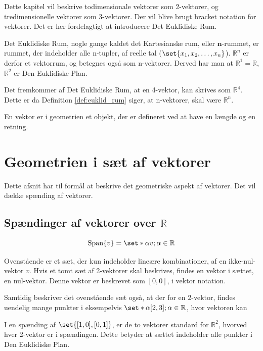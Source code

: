 Dette kapitel vil beskrive todimensionale vektorer som 2-vektorer, og tredimensionelle vektorer som 3-vektorer.
Der vil blive brugt bracket notation for vektorer.
Det er her fordelagtigt at introducere Det Euklidiske Rum.
\begin{frdef}\label{def:euklid_rum}
	Det Euklidiske Rum, nogle gange kaldet det Kartesianske rum, eller $\mathbf{n}$-rummet, er rummet, der indeholder alle n-tupler, af reelle tal ($\set{x_1,x_2,\dots,x_n}$).
$\mathbb{R}^n$ er derfor et vektorrum, og betegnes også som n-vektorer.
Derved har man at $\mathbb{R}^1=\mathbb{R}$, $\mathbb{R}^2$ er Den Euklidiske Plan.
\end{frdef}

Det fremkommer af Det Euklidiske Rum, at en 4-vektor, kan skrives som $\mathbb{R}^4$.
Dette er da Definition \ref{def:euklid_rum} siger, at n-vektorer, skal være $\mathbb{R}^n$.

\begin{frdef}[Vektorer]
	En vektor er i geometrien et objekt, der er defineret ved at have en længde og en retning.
\end{frdef}


\section{Geometrien i sæt af vektorer}
Dette afsnit har til formål at beskrive det geometriske aspekt af vektorer.
Det vil dække spænding af vektorer.

\subsection{Spændinger af vektorer over $\mathbb{R}$}
 
\begin{equation}
	\mathrm{Span}\{v\}=\set*{\alpha v; \alpha\in\mathbb{R}}
\end{equation}

Ovenstående er et sæt, der kun indeholder lineære kombinationer, af en ikke-nul-vektor $v$.
Hvis et tomt sæt af 2-vektorer skal beskrives, findes en vektor i sættet, en nul-vektor.
Denne vektor er beskrevet som $[0,0]$, i vektor notation.

Samtidig beskriver det ovenstående sæt også, at der for en 2-vektor, findes uendelig mange punkter i eksempelvis $\set*{\alpha[2,3]; \alpha\in\mathbb{R}}$, hvor vektoren kan 

I en spænding af $\set{[1,0],[0,1]}$, er de to vektorer standard for $\mathbb{R}^2$, hvorved hver 2-vektor er i spændingen.
Dette betyder at sættet indeholder alle punkter i Den Euklidiske Plan.

